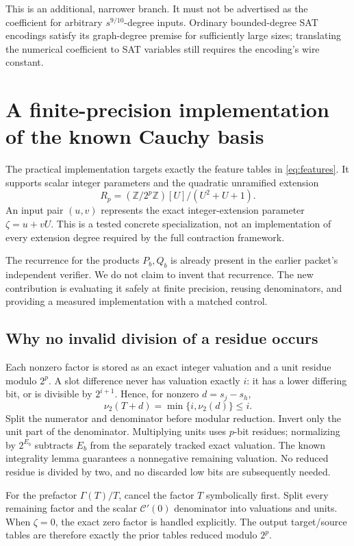 \documentclass[11pt]{article}
\theoremstyle{definition}\newtheorem{definition}[theorem]{Definition}
\theoremstyle{remark}\newtheorem{remark}[theorem]{Remark}
\newcommand{\vv}{\nu_2}
\begin{document}
This is an additional, narrower branch. It must not be advertised as the
coefficient for arbitrary $s^{9/10}$-degree inputs. Ordinary bounded-degree
SAT encodings satisfy its graph-degree premise for sufficiently large sizes;
translating the numerical coefficient to SAT variables still requires the
encoding's wire constant.

\section{A finite-precision implementation of the known Cauchy basis}
\label{sec:kernel}

The practical implementation targets exactly the feature tables in
\eqref{eq:features}. It supports scalar integer parameters and the quadratic
unramified extension
\[
 R_p=(\mathbb Z/2^p\mathbb Z)[U]/(U^2+U+1).
\]
An input pair $(u,v)$ represents the exact integer-extension parameter
$\zeta=u+vU$. This is a tested concrete specialization, not an implementation
of every extension degree required by the full contraction framework.

The recurrence for the products $P_b,Q_b$ is already present in the earlier
packet's independent verifier. We do not claim to invent that recurrence.
The new contribution is evaluating it safely at finite precision, reusing
denominators, and providing a measured implementation with a matched control.

\subsection{Why no invalid division of a residue occurs}

Each nonzero factor is stored as an exact integer valuation and a unit residue
modulo $2^p$. A slot difference never has valuation exactly $i$: it has a
lower differing bit, or is divisible by $2^{i+1}$. Hence, for nonzero
$d=s_j-s_h$,
\[
 \vv(T+d)=\min\{i,\vv(d)\}\le i.
\]
Split the numerator and denominator before modular reduction. Invert only
the unit part of the denominator. Multiplying units uses $p$-bit residues;
normalizing by $2^{E_b}$ subtracts $E_b$ from the separately tracked exact
valuation. The known integrality lemma guarantees a nonnegative remaining
valuation. No reduced residue is divided by two, and no discarded low bits
are subsequently needed.

For the prefactor $\Gamma(T)/T$, cancel the factor $T$ symbolically first.
Split every remaining factor and the scalar $\mathcal C'(0)$ denominator
into valuations and units. When $\zeta=0$, the exact zero factor is handled
explicitly. The output target/source tables are therefore exactly the prior
tables reduced modulo $2^p$.
\end{document}
